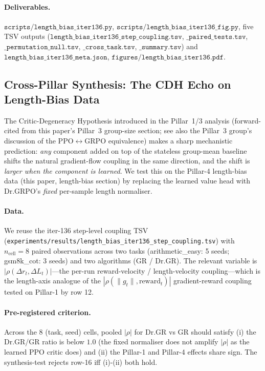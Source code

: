 \documentclass{article}
\begin{document}
\paragraph{Deliverables.}
$\texttt{scripts/length\_bias\_iter136.py}$, $\texttt{scripts/length\_bias\_iter136\_fig.py}$,
five TSV outputs ($\texttt{length\_bias\_iter136\_step\_coupling.tsv}$,
$\texttt{\_paired\_tests.tsv}$, $\texttt{\_permutation\_null.tsv}$,
$\texttt{\_cross\_task.tsv}$, $\texttt{\_summary.tsv}$) and
$\texttt{length\_bias\_iter136\_meta.json}$,
$\texttt{figures/length\_bias\_iter136.pdf}$.
 

\subsection{Cross-Pillar Synthesis: The CDH Echo on Length-Bias Data}
\label{sec:cdh-echo}

The Critic-Degeneracy Hypothesis introduced in the Pillar~1/3
analysis (forward-cited from this paper's Pillar~3 group-size
section; see also the Pillar~3 group's discussion of the
PPO$\leftrightarrow$GRPO equivalence) makes a sharp mechanistic
prediction: \emph{any} component added on top of the stateless
group-mean baseline shifts the natural gradient-flow coupling in
the same direction, and the shift is \emph{larger when the
component is learned}. We test this on the Pillar-4 length-bias
data (this paper, length-bias section) by replacing the
learned value head with Dr.GRPO's \emph{fixed} per-sample length
normaliser.

\paragraph{Data.}
We reuse the iter-136 step-level coupling TSV
(\texttt{experiments/results/length\_bias\_iter136\_step\_coupling.tsv})
with $n_{\text{cell}} = 8$ paired observations across two tasks
(arithmetic\_easy: 5 seeds; gsm8k\_cot: 3 seeds) and two algorithms
(GR / Dr.GR). The relevant variable is
$|\rho(\Delta r_t,\Delta L_t)|$---the per-run reward-velocity /
length-velocity coupling---which is the length-axis analogue of
the $|\rho(\|g_t\|, \mathrm{reward}_t)|$ gradient-reward coupling
tested on Pillar-1 by row 12.

\paragraph{Pre-registered criterion.}
Across the 8 (task, seed) cells, pooled $|\rho|$ for Dr.GR vs GR
should satisfy (i) the Dr.GR/GR ratio is below $1.0$ (the fixed
normaliser does not amplify $|\rho|$ as the learned PPO critic
does) and (ii) the Pillar-1 and Pillar-4 effects share sign. The
synthesis-test rejects row-16 iff (i)-(ii) both hold.
\end{document}
